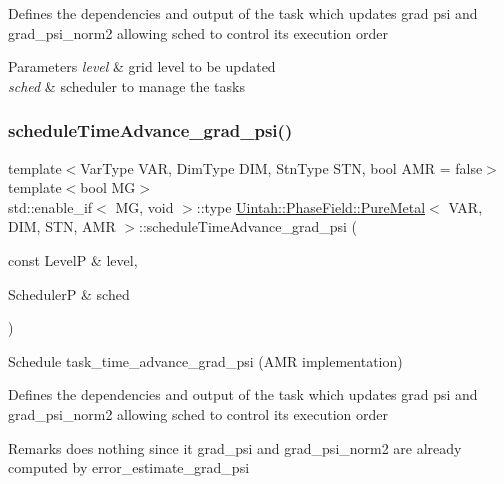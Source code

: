 Defines the dependencies and output of the task which updates grad psi and grad\+\_\+psi\+\_\+norm2 allowing sched to control its execution order


\begin{DoxyParams}{Parameters}
{\em level} & grid level to be updated \\
\hline
{\em sched} & scheduler to manage the tasks \\
\hline
\end{DoxyParams}
\mbox{\label{classUintah_1_1PhaseField_1_1PureMetal_a4567da5b0cded42b606b75572f3b0599}} 
\subsubsection{\texorpdfstring{schedule\+Time\+Advance\+\_\+grad\+\_\+psi()}{scheduleTimeAdvance\_grad\_psi()}\hspace{0.1cm}{\footnotesize\ttfamily [2/2]}}
{\footnotesize\ttfamily template$<$Var\+Type V\+AR, Dim\+Type D\+IM, Stn\+Type S\+TN, bool A\+MR = false$>$ \\
template$<$bool MG$>$ \\
std\+::enable\+\_\+if$<$ MG, void $>$\+::type \hyperlink{classUintah_1_1PhaseField_1_1PureMetal}{Uintah\+::\+Phase\+Field\+::\+Pure\+Metal}$<$ V\+AR, D\+IM, S\+TN, A\+MR $>$\+::schedule\+Time\+Advance\+\_\+grad\+\_\+psi (\begin{DoxyParamCaption}\item[{const LevelP \&}]{level,  }\item[{SchedulerP \&}]{sched }\end{DoxyParamCaption})\hspace{0.3cm}{\ttfamily [protected]}}



Schedule task\+\_\+time\+\_\+advance\+\_\+grad\+\_\+psi (A\+MR implementation) 

Defines the dependencies and output of the task which updates grad psi and grad\+\_\+psi\+\_\+norm2 allowing sched to control its execution order

\begin{DoxyRemark}{Remarks}
does nothing since it grad\+\_\+psi and grad\+\_\+psi\+\_\+norm2 are already computed by error\+\_\+estimate\+\_\+grad\+\_\+psi
\end{DoxyRemark}

